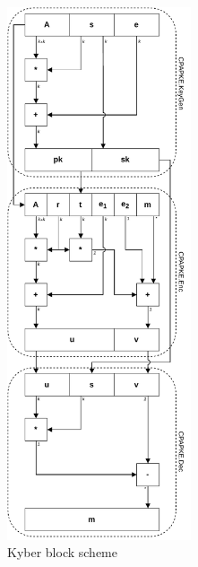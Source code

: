 \begin{figure}[ht!]
  \centering
  \includegraphics[width=0.484\textwidth]{pictures/kyber_all.pdf}
  \caption{Kyber block scheme}
  \label{img:kyber_all}
\end{figure}

